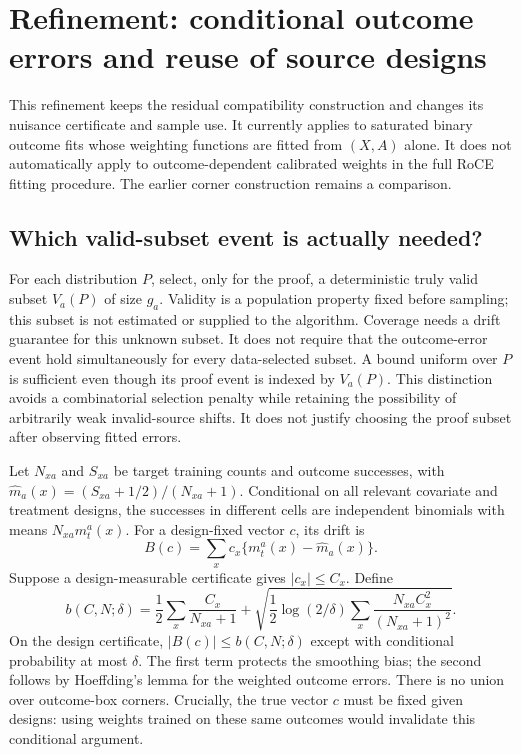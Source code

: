 \section{Refinement: conditional outcome errors and reuse of source designs}
\label{sec:conditional-refinement}

This refinement keeps the residual compatibility construction and changes its
nuisance certificate and sample use. It currently applies to saturated binary
outcome fits whose weighting functions are fitted from $(X,A)$ alone. It does
not automatically apply to outcome-dependent calibrated weights in the full
RoCE fitting procedure. The earlier corner construction remains a comparison.

\subsection{Which valid-subset event is actually needed?}

For each distribution $P$, select, only for the proof, a deterministic truly
valid subset $V_a(P)$ of size $g_a$. Validity is a population property fixed
before sampling; this subset is not estimated or supplied to the algorithm.
Coverage needs a drift guarantee for this unknown subset. It does not require
that the outcome-error event hold simultaneously for every data-selected subset.
A bound uniform over $P$ is sufficient even though its proof event is indexed
by $V_a(P)$. This distinction avoids a combinatorial selection penalty while
retaining the possibility of arbitrarily weak invalid-source shifts. It does
not justify choosing the proof subset after observing fitted errors.

Let $N_{xa}$ and $S_{xa}$ be target training counts and outcome successes,
with $\hat m_a(x)=(S_{xa}+1/2)/(N_{xa}+1)$. Conditional on all relevant
covariate and treatment designs, the successes in different cells are
independent binomials with means $N_{xa}m_t^a(x)$. For a design-fixed vector
$c$, its drift is
\[
 B(c)=\sum_xc_x\{m_t^a(x)-\hat m_a(x)\}.
\]
Suppose a design-measurable certificate gives $|c_x|\le C_x$. Define
\begin{equation}
 b(C,N;\delta)=\frac12\sum_x\frac{C_x}{N_{xa}+1}
 +\sqrt{\frac12\log(2/\delta)
                \sum_x\frac{N_{xa}C_x^2}{(N_{xa}+1)^2}}.
 \label{eq:v4-scalar-radius}
\end{equation}
On the design certificate, $|B(c)|\le b(C,N;\delta)$ except with conditional
probability at most $\delta$. The first term protects the smoothing bias;
the second follows by Hoeffding's lemma for the weighted outcome errors.
There is no union over outcome-box corners. Crucially, the true vector $c$
must be fixed given designs: using weights trained on these same outcomes
would invalidate this conditional argument.


